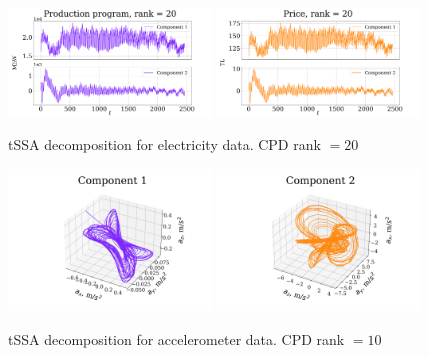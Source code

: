 \documentclass[referee, pdflatex, sn-mathphys-num]{sn-jnl}
\theoremstyle{definition}
\theoremstyle{plain}
\begin{document}
	\begin{figure}[h]
		\centering
		\includegraphics[width=0.48\textwidth, keepaspectratio]{Production program_decomp.png}
		\includegraphics[width=0.48\textwidth, keepaspectratio]{Price_decomp.png}
		\caption{tSSA decomposition for electricity data. CPD rank $ = 20 $}\label{fig:electr_decomp_tssa}
	\end{figure}
	
	\begin{figure}[h]
		\centering
		\includegraphics[width=0.48\textwidth, 	keepaspectratio]{acceler_1.png}
		\includegraphics[width=0.48\textwidth, keepaspectratio]{acceler_2.png}
		\caption{tSSA decomposition for accelerometer data. CPD rank $ = 10 $}\label{fig:accel_decomp_tssa}
	\end{figure}
	
\end{document}
